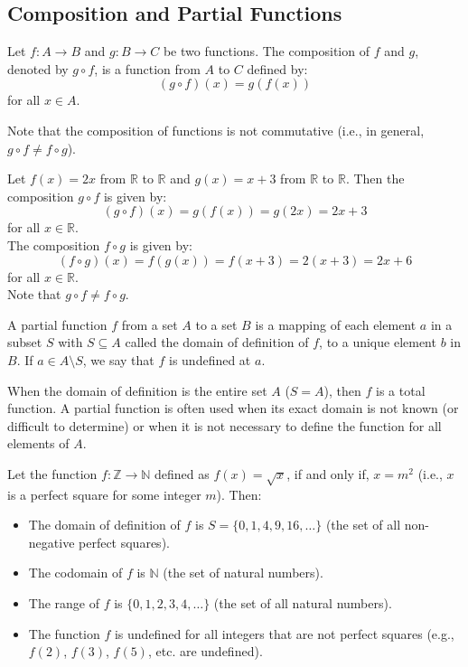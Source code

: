\subsection{Composition and Partial Functions}
\begin{definition}
    Let $f: A \to B$ and $g: B \to C$ be two functions. The composition of $f$ and $g$, denoted by $g \circ f$, is a function from $A$ to $C$ defined by:
    \[ (g \circ f)(x) = g(f(x)) \]
    for all $x \in A$.
\end{definition}
Note that the composition of functions is not commutative (i.e., in general, $g \circ f \neq f \circ g$).
\begin{eg}
    Let $f(x) = 2x$ from $\mathbb{R}$ to $\mathbb{R}$ and $g(x) = x + 3$ from $\mathbb{R}$ to $\mathbb{R}$. Then the composition $g \circ f$ is given by:
    \[ (g \circ f)(x) = g(f(x)) = g(2x) = 2x + 3 \]
    for all $x \in \mathbb{R}$. \\
    The composition $f \circ g$ is given by:
    \[ (f \circ g)(x) = f(g(x)) = f(x + 3) = 2(x + 3) = 2x + 6 \]
    for all $x \in \mathbb{R}$. \\
    Note that $g \circ f \neq f \circ g$.
\end{eg}

\begin{definition}
    A partial function $f$ from a set $A$ to a set $B$ is a mapping of each element $a$ in a subset $S$ with $S \subseteq A$ called the domain of definition of $f$, to a unique element $b$ in $B$. If $a \in A \setminus S$, we say that $f$ is undefined at $a$.
\end{definition}
When the domain of definition is the entire set $A$ ($S = A$), then $f$ is a total function. A partial function is often used when its exact domain is not known (or difficult to determine) or when it is not necessary to define the function for all elements of $A$.

\begin{eg}
    Let the function $f: \mathbb{Z} \to \mathbb{N}$ defined as $f(x) = \sqrt{x}$, if and only if, $x = m^2$ (i.e., $x$ is a perfect square for some integer $m$). Then:
    \begin{itemize}[itemsep=1pt,label=$\circ$]
        \item The domain of definition of $f$ is $S = \{0, 1, 4, 9, 16, \ldots\}$ (the set of all non-negative perfect squares).
        \item The codomain of $f$ is $\mathbb{N}$ (the set of natural numbers).
        \item The range of $f$ is $\{0, 1, 2, 3, 4, \ldots\}$ (the set of all natural numbers).
        \item The function $f$ is undefined for all integers that are not perfect squares (e.g., $f(2)$, $f(3)$, $f(5)$, etc. are undefined).
    \end{itemize}
\end{eg}

